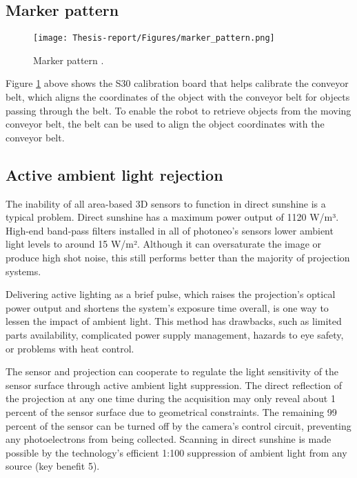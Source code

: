 \documentclass[12pt]{article}
\begin{document}
\subsection{Marker pattern}
\begin{figure}[h]
    \centering
    \texttt{[image: Thesis-report/Figures/marker\_pattern.png]}
    \caption{Marker pattern \cite{ref2}.}
    \label{fig:marker-pattern}
\end{figure}

Figure \ref{fig:marker-pattern} above shows the S30 calibration board that helps calibrate the conveyor belt, which aligns the coordinates of the object with the conveyor belt for objects passing through the belt. To enable the robot to retrieve objects from the moving conveyor belt, the belt can be used to align the object coordinates with the conveyor belt\cite{ref2}.

\subsection{Active ambient light rejection}
The inability of all area-based 3D sensors to function in direct sunshine is a typical problem.  Direct sunshine has a maximum power output of 1120 W/m³. High-end band-pass filters installed in all of photoneo's sensors lower ambient light levels to around 15 W/m².  Although it can oversaturate the image or produce high shot noise, this still performs better than the majority of projection systems.

Delivering active lighting as a brief pulse, which raises the projection's optical power output and shortens the system's exposure time overall, is one way to lessen the impact of ambient light.  This method has drawbacks, such as limited parts availability, complicated power supply management, hazards to eye safety, or problems with heat control\cite{ref15}.

The sensor and projection can cooperate to regulate the light sensitivity of the sensor surface through active ambient light suppression. The direct reflection of the projection at any one time during the acquisition may only reveal about 1 percent of the sensor surface due to geometrical constraints.  The remaining 99 percent of the sensor can be turned off by the camera's control circuit, preventing any photoelectrons from being collected.  Scanning in direct sunshine is made possible by the technology's efficient 1:100 suppression of ambient light from any source (key benefit 5)\cite{ref15}.
\end{document}
